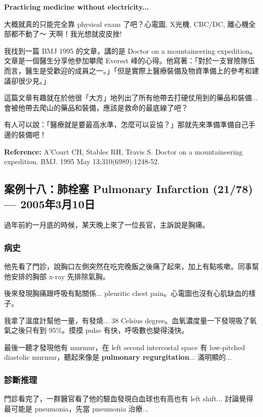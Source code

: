 \documentclass[12pt,a4paper]{article}
\newenvironment{myquote}{%
    \begin{tcolorbox}[
        colback=quote_bg,
        colframe=emergency_gray,
        boxrule=0pt,
        leftrule=3pt,
        arc=0pt,
        left=10pt,
        right=10pt,
        top=8pt,
        bottom=8pt
    ]
    \itshape
}{%
    \end{tcolorbox}
}
\begin{document}
\textbf{Practicing medicine without electricity...}

大概就真的只能完全靠 physical exam 了吧？心電圖, X光機, CBC/DC, 離心機全部都不動了～ 天啊！我光想就皮皮挫!

我找到一篇 BMJ 1995 的文章，講的是 Doctor on a mountaineering expedition。文章是一個醫生分享他參加攀爬 Everest 峰的心得。他寫著：「對於一支冒險隊伍而言，醫生是受歡迎的成員之一。」「但是實際上醫療裝備及物資準備上的參考和建議卻很少見。」

這篇文章有趣就在於他很「大方」地列出了所有他帶去打硬仗用到的藥品和裝備...會被他帶去爬山的藥品和裝備，應該是救命的最底線了吧？

\begin{myquote}
有人可以說：「醫療就是要最高水準，怎麼可以妥協？」那就先來準備準備自己手邊的裝備吧！
\end{myquote}

\textbf{Reference:} A'Court CH, Stables RH, Travis S. Doctor on a mountaineering expedition. BMJ. 1995 May 13;310(6989):1248-52.

\subsection{案例十八：肺栓塞 Pulmonary Infarction (21/78) — 2005年3月10日}

過年前約一月底的時候，某天晚上來了一位長官，主訴說是胸痛。

\subsubsection{病史}

他先看了門診，說胸口左側突然在吃完晚飯之後痛了起來，加上有點咳嗽。同事幫他安排的胸部 x-ray 先排除氣胸。

後來發現胸痛跟呼吸有點關係... pleuritic chest pain。心電圖也沒有心肌缺血的樣子。

我拿了溫度計幫他一量，有發燒... 38 Celsius degree。血氧濃度量一下發現吸了氧氣之後只有到 95\%。摸摸 pulse 有快，呼吸數也變得淺快。

最後一聽才發現他有 murmur，在 left second intercostal space 有 low-pitched diastolic murmur，聽起來像是 \textbf{pulmonary regurgitation}... 滿明顯的...

\subsubsection{診斷推理}

門診看完了，一群醫官看了他的驗血發現白血球也有高也有 left shift... 討論覺得最可能是 pneumonia，先當 pneumonia 治療...
\end{document}
